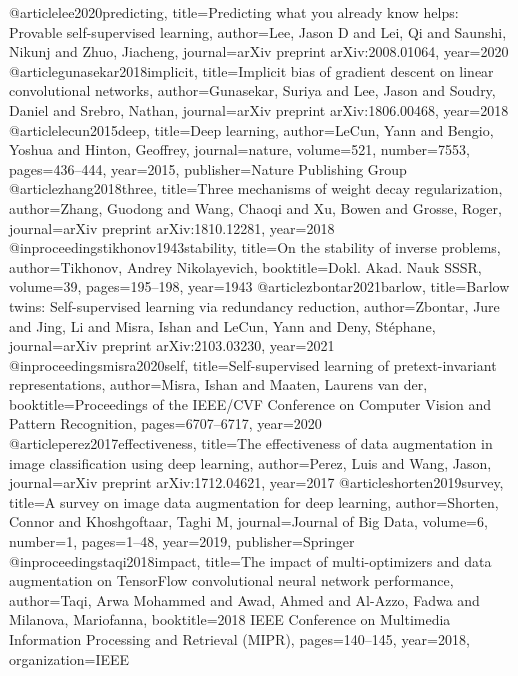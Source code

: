 \documentclass[nohyperref]{article}
\theoremstyle{plain}
\theoremstyle{definition}
\theoremstyle{remark}
\begin{document}
@article{lee2020predicting,
  title={Predicting what you already know helps: Provable self-supervised learning},
  author={Lee, Jason D and Lei, Qi and Saunshi, Nikunj and Zhuo, Jiacheng},
  journal={arXiv preprint arXiv:2008.01064},
  year={2020}
}
@article{gunasekar2018implicit,
  title={Implicit bias of gradient descent on linear convolutional networks},
  author={Gunasekar, Suriya and Lee, Jason and Soudry, Daniel and Srebro, Nathan},
  journal={arXiv preprint arXiv:1806.00468},
  year={2018}
}
@article{lecun2015deep,
  title={Deep learning},
  author={LeCun, Yann and Bengio, Yoshua and Hinton, Geoffrey},
  journal={nature},
  volume={521},
  number={7553},
  pages={436--444},
  year={2015},
  publisher={Nature Publishing Group}
}
@article{zhang2018three,
  title={Three mechanisms of weight decay regularization},
  author={Zhang, Guodong and Wang, Chaoqi and Xu, Bowen and Grosse, Roger},
  journal={arXiv preprint arXiv:1810.12281},
  year={2018}
}
@inproceedings{tikhonov1943stability,
  title={On the stability of inverse problems},
  author={Tikhonov, Andrey Nikolayevich},
  booktitle={Dokl. Akad. Nauk SSSR},
  volume={39},
  pages={195--198},
  year={1943}
}
@article{zbontar2021barlow,
  title={Barlow twins: Self-supervised learning via redundancy reduction},
  author={Zbontar, Jure and Jing, Li and Misra, Ishan and LeCun, Yann and Deny, St{\'e}phane},
  journal={arXiv preprint arXiv:2103.03230},
  year={2021}
}
@inproceedings{misra2020self,
  title={Self-supervised learning of pretext-invariant representations},
  author={Misra, Ishan and Maaten, Laurens van der},
  booktitle={Proceedings of the IEEE/CVF Conference on Computer Vision and Pattern Recognition},
  pages={6707--6717},
  year={2020}
}
@article{perez2017effectiveness,
  title={The effectiveness of data augmentation in image classification using deep learning},
  author={Perez, Luis and Wang, Jason},
  journal={arXiv preprint arXiv:1712.04621},
  year={2017}
}
@article{shorten2019survey,
  title={A survey on image data augmentation for deep learning},
  author={Shorten, Connor and Khoshgoftaar, Taghi M},
  journal={Journal of Big Data},
  volume={6},
  number={1},
  pages={1--48},
  year={2019},
  publisher={Springer}
}
@inproceedings{taqi2018impact,
  title={The impact of multi-optimizers and data augmentation on TensorFlow convolutional neural network performance},
  author={Taqi, Arwa Mohammed and Awad, Ahmed and Al-Azzo, Fadwa and Milanova, Mariofanna},
  booktitle={2018 IEEE Conference on Multimedia Information Processing and Retrieval (MIPR)},
  pages={140--145},
  year={2018},
  organization={IEEE}
}
\end{document}
